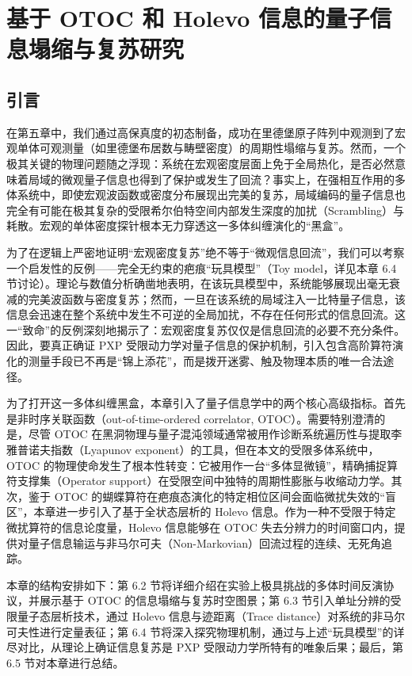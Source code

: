 \documentclass[../main.tex]{subfiles}
\begin{document}
\chapter{基于 OTOC 和 Holevo 信息的量子信息塌缩与复苏研究}

\section{引言}
在第五章中，我们通过高保真度的初态制备，成功在里德堡原子阵列中观测到了宏观单体可观测量（如里德堡布居数与畴壁密度）的周期性塌缩与复苏。然而，一个极其关键的物理问题随之浮现：系统在宏观密度层面上免于全局热化，是否必然意味着局域的微观量子信息也得到了保护或发生了回流？事实上，在强相互作用的多体系统中，即使宏观波函数或密度分布展现出完美的复苏，局域编码的量子信息也完全有可能在极其复杂的受限希尔伯特空间内部发生深度的加扰（Scrambling）与耗散。宏观的单体密度探针根本无力穿透这一多体纠缠演化的“黑盒”。

为了在逻辑上严密地证明“宏观密度复苏”绝不等于“微观信息回流”，我们可以考察一个启发性的反例——完全无约束的疤痕“玩具模型”（Toy model，详见本章 6.4 节讨论）\cite{choi2019emergent}。理论与数值分析确凿地表明，在该玩具模型中，系统能够展现出毫无衰减的完美波函数与密度复苏；然而，一旦在该系统的局域注入一比特量子信息，该信息会迅速在整个系统中发生不可逆的全局加扰，不存在任何形式的信息回流。这一“致命”的反例深刻地揭示了：宏观密度复苏仅仅是信息回流的必要不充分条件。因此，要真正确证 PXP 受限动力学对量子信息的保护机制，引入包含高阶算符演化的测量手段已不再是“锦上添花”，而是拨开迷雾、触及物理本质的唯一合法途径。

为了打开这一多体纠缠黑盒，本章引入了量子信息学中的两个核心高级指标。首先是非时序关联函数（out-of-time-ordered correlator, OTOC）。需要特别澄清的是，尽管 OTOC 在黑洞物理与量子混沌领域通常被用作诊断系统遍历性与提取李雅普诺夫指数（Lyapunov exponent）的工具\cite{hayden2007black,shenker2014black,lewis2019dynamics}，但在本文的受限多体系统中，OTOC 的物理使命发生了根本性转变：它被用作一台“多体显微镜”，精确捕捉算符支撑集（Operator support）在受限空间中独特的周期性膨胀与收缩动力学。其次，鉴于 OTOC 的蝴蝶算符在疤痕态演化的特定相位区间会面临微扰失效的“盲区”，本章进一步引入了基于全状态层析的 Holevo 信息\cite{yuan2022quantum}。作为一种不受限于特定微扰算符的信息论度量，Holevo 信息能够在 OTOC 失去分辨力的时间窗口内，提供对量子信息输运与非马尔可夫（Non-Markovian）回流过程的连续、无死角追踪。

本章的结构安排如下：第 6.2 节将详细介绍在实验上极具挑战的多体时间反演协议，并展示基于 OTOC 的信息塌缩与复苏时空图景；第 6.3 节引入单址分辨的受限量子态层析技术，通过 Holevo 信息与迹距离（Trace distance）对系统的非马尔可夫性进行定量表征；第 6.4 节将深入探究物理机制，通过与上述“玩具模型”的详尽对比，从理论上确证信息复苏是 PXP 受限动力学所特有的唯象后果；最后，第 6.5 节对本章进行总结。
\end{document}
